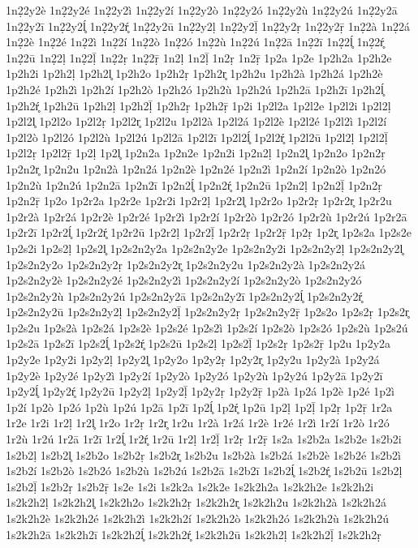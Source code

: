 {1n2̣2y2è
1n2̣2y2é
1n2̣2y2ì
1n2̣2y2í
1n2̣2y2ò
1n2̣2y2ó
1n2̣2y2ù
1n2̣2y2ú
1n2̣2y2ā
1n2̣2y2ī
1n2̣2y2ĺ̥
1n2̣2y2ŕ̥
1n2̣2y2ū
1n2̣2y2ḷ
1n2̣2y2ḹ
1n2̣2y2ṛ
1n2̣2y2ṝ
1n2̣2à
1n2̣2á
1n2̣2è
1n2̣2é
1n2̣2ì
1n2̣2í
1n2̣2ò
1n2̣2ó
1n2̣2ù
1n2̣2ú
1n2̣2ā
1n2̣2ī
1n2̣2ĺ̥
1n2̣2ŕ̥
1n2̣2ū
1n2̣2ḷ
1n2̣2ḹ
1n2̣2ṛ
1n2̣2ṝ
1n2ḷ
1n2ḹ
1n2ṛ
1n2ṝ
1p2a
1p2e
1p2h2a
1p2h2e
1p2h2i
1p2h2ḷ
1p2h2l̥
1p2h2o
1p2h2ṛ
1p2h2r̥
1p2h2u
1p2h2à
1p2h2á
1p2h2è
1p2h2é
1p2h2ì
1p2h2í
1p2h2ò
1p2h2ó
1p2h2ù
1p2h2ú
1p2h2ā
1p2h2ī
1p2h2ĺ̥
1p2h2ŕ̥
1p2h2ū
1p2h2ḷ
1p2h2ḹ
1p2h2ṛ
1p2h2ṝ
1p2i
1p2l2a
1p2l2e
1p2l2i
1p2l2ḷ
1p2l2l̥
1p2l2o
1p2l2ṛ
1p2l2r̥
1p2l2u
1p2l2à
1p2l2á
1p2l2è
1p2l2é
1p2l2ì
1p2l2í
1p2l2ò
1p2l2ó
1p2l2ù
1p2l2ú
1p2l2ā
1p2l2ī
1p2l2ĺ̥
1p2l2ŕ̥
1p2l2ū
1p2l2ḷ
1p2l2ḹ
1p2l2ṛ
1p2l2ṝ
1p2ḷ
1p2l̥
1p2n2a
1p2n2e
1p2n2i
1p2n2ḷ
1p2n2l̥
1p2n2o
1p2n2ṛ
1p2n2r̥
1p2n2u
1p2n2à
1p2n2á
1p2n2è
1p2n2é
1p2n2ì
1p2n2í
1p2n2ò
1p2n2ó
1p2n2ù
1p2n2ú
1p2n2ā
1p2n2ī
1p2n2ĺ̥
1p2n2ŕ̥
1p2n2ū
1p2n2ḷ
1p2n2ḹ
1p2n2ṛ
1p2n2ṝ
1p2o
1p2r2a
1p2r2e
1p2r2i
1p2r2ḷ
1p2r2l̥
1p2r2o
1p2r2ṛ
1p2r2r̥
1p2r2u
1p2r2à
1p2r2á
1p2r2è
1p2r2é
1p2r2ì
1p2r2í
1p2r2ò
1p2r2ó
1p2r2ù
1p2r2ú
1p2r2ā
1p2r2ī
1p2r2ĺ̥
1p2r2ŕ̥
1p2r2ū
1p2r2ḷ
1p2r2ḹ
1p2r2ṛ
1p2r2ṝ
1p2ṛ
1p2r̥
1p2s2a
1p2s2e
1p2s2i
1p2s2ḷ
1p2s2l̥
1p2s2n2y2a
1p2s2n2y2e
1p2s2n2y2i
1p2s2n2y2ḷ
1p2s2n2y2l̥
1p2s2n2y2o
1p2s2n2y2ṛ
1p2s2n2y2r̥
1p2s2n2y2u
1p2s2n2y2à
1p2s2n2y2á
1p2s2n2y2è
1p2s2n2y2é
1p2s2n2y2ì
1p2s2n2y2í
1p2s2n2y2ò
1p2s2n2y2ó
1p2s2n2y2ù
1p2s2n2y2ú
1p2s2n2y2ā
1p2s2n2y2ī
1p2s2n2y2ĺ̥
1p2s2n2y2ŕ̥
1p2s2n2y2ū
1p2s2n2y2ḷ
1p2s2n2y2ḹ
1p2s2n2y2ṛ
1p2s2n2y2ṝ
1p2s2o
1p2s2ṛ
1p2s2r̥
1p2s2u
1p2s2à
1p2s2á
1p2s2è
1p2s2é
1p2s2ì
1p2s2í
1p2s2ò
1p2s2ó
1p2s2ù
1p2s2ú
1p2s2ā
1p2s2ī
1p2s2ĺ̥
1p2s2ŕ̥
1p2s2ū
1p2s2ḷ
1p2s2ḹ
1p2s2ṛ
1p2s2ṝ
1p2u
1p2y2a
1p2y2e
1p2y2i
1p2y2ḷ
1p2y2l̥
1p2y2o
1p2y2ṛ
1p2y2r̥
1p2y2u
1p2y2à
1p2y2á
1p2y2è
1p2y2é
1p2y2ì
1p2y2í
1p2y2ò
1p2y2ó
1p2y2ù
1p2y2ú
1p2y2ā
1p2y2ī
1p2y2ĺ̥
1p2y2ŕ̥
1p2y2ū
1p2y2ḷ
1p2y2ḹ
1p2y2ṛ
1p2y2ṝ
1p2à
1p2á
1p2è
1p2é
1p2ì
1p2í
1p2ò
1p2ó
1p2ù
1p2ú
1p2ā
1p2ī
1p2ĺ̥
1p2ŕ̥
1p2ū
1p2ḷ
1p2ḹ
1p2ṛ
1p2ṝ
1r2a
1r2e
1r2i
1r2ḷ
1r2l̥
1r2o
1r2ṛ
1r2r̥
1r2u
1r2à
1r2á
1r2è
1r2é
1r2ì
1r2í
1r2ò
1r2ó
1r2ù
1r2ú
1r2ā
1r2ī
1r2ĺ̥
1r2ŕ̥
1r2ū
1r2ḷ
1r2ḹ
1r2ṛ
1r2ṝ
1s2a
1s2b2a
1s2b2e
1s2b2i
1s2b2ḷ
1s2b2l̥
1s2b2o
1s2b2ṛ
1s2b2r̥
1s2b2u
1s2b2à
1s2b2á
1s2b2è
1s2b2é
1s2b2ì
1s2b2í
1s2b2ò
1s2b2ó
1s2b2ù
1s2b2ú
1s2b2ā
1s2b2ī
1s2b2ĺ̥
1s2b2ŕ̥
1s2b2ū
1s2b2ḷ
1s2b2ḹ
1s2b2ṛ
1s2b2ṝ
1s2e
1s2i
1s2k2a
1s2k2e
1s2k2h2a
1s2k2h2e
1s2k2h2i
1s2k2h2ḷ
1s2k2h2l̥
1s2k2h2o
1s2k2h2ṛ
1s2k2h2r̥
1s2k2h2u
1s2k2h2à
1s2k2h2á
1s2k2h2è
1s2k2h2é
1s2k2h2ì
1s2k2h2í
1s2k2h2ò
1s2k2h2ó
1s2k2h2ù
1s2k2h2ú
1s2k2h2ā
1s2k2h2ī
1s2k2h2ĺ̥
1s2k2h2ŕ̥
1s2k2h2ū
1s2k2h2ḷ
1s2k2h2ḹ
1s2k2h2ṛ
}
